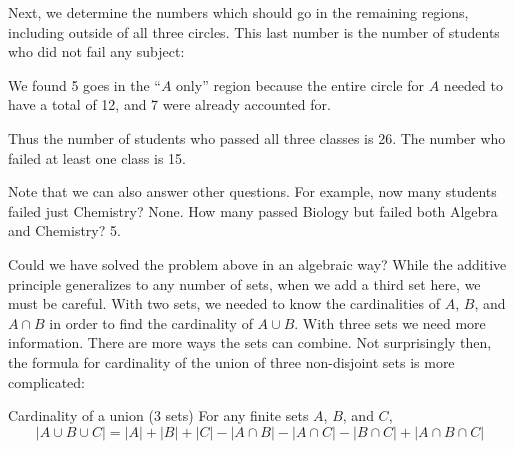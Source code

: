 \documentclass[12pt]{article}
\begin{document}
\begin{example}
\begin{solution}
\begin{center}
\end{center}

Next, we determine the numbers which should go in the remaining regions, including outside of all three circles.  This last number is the number of students who did not fail any subject:

\begin{center}
\end{center}

We found 5 goes in the ``$A$ only'' region because the entire circle for $A$ needed to have a total of 12, and 7 were already accounted for.

Thus the number of students who passed all three classes is 26.  The number who failed at least one class is 15.

Note that we can also answer other questions.  For example, now many students failed just Chemistry?  None.  How many passed Biology but failed both Algebra and Chemistry? 5.

 \end{solution}
\end{example}

Could we have solved the problem above in an algebraic way?  While the additive principle generalizes to any number of sets, when we add a third set here, we must be careful. With two sets, we needed to know the cardinalities of $A$, $B$, and $A \cap B$ in order to find the cardinality of $A \cup B$.  With three sets we need more information.  There are more ways the sets can combine.  Not surprisingly then, the formula for cardinality of the union of three non-disjoint sets is more complicated:


\begin{defbox}{Cardinality of a union (3 sets)}
  For any finite sets $A$, $B$, and $C$,
  \[|A \cup B \cup C| = |A| + |B| + |C| - |A \cap B| - |A \cap C| - |B \cap C| + |A \cap B \cap C|\]
\end{defbox}
\end{document}

